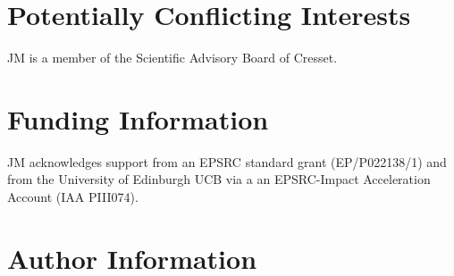 \documentclass[9pt,tutorial]{livecoms}
\begin{document}
\section{Potentially Conflicting Interests}
JM is a member of the Scientific Advisory Board of Cresset. 

\section{Funding Information}
JM acknowledges support from an EPSRC standard grant (EP/P022138/1) and from the University of Edinburgh UCB via a an EPSRC-Impact Acceleration Account (IAA PIII074).

\section*{Author Information}
\makeorcid




\end{document}
